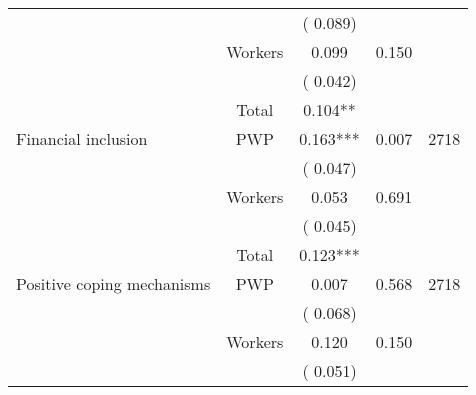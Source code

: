 \begin{tabular}{l*{4}{c}}
                               &                               &       (       0.089)                     & &                                                                             \\ 
                               &       Workers         &              0.099               &        0.150   &                                               \\ 
                               &                               &       (       0.042)                     & &                                                                             \\ 
\cmidrule{2-3}
                               &       Total           &              0.104**                 &    &                                               \\ 
\cmidrule{2-3}
 Financial inclusion                 &       PWP     &              0.163***               &        0.007   & 2718                              \\ 
                               &                               &       (       0.047)                     & &                                                                             \\ 
                               &       Workers         &              0.053               &        0.691   &                                               \\ 
                               &                               &       (       0.045)                     & &                                                                             \\ 
\cmidrule{2-3}
                               &       Total           &              0.123***                 &    &                                               \\ 
\cmidrule{2-3}
 Positive coping mechanisms                &       PWP     &              0.007               &       0.568    & 2718                              \\ 
                               &                               &       (       0.068)                     & &                                                                             \\ 
                               &       Workers         &              0.120               &        0.150   &                                               \\ 
                               &                               &       (       0.051)                     & &                                                                             \\ 

\end{tabular}
